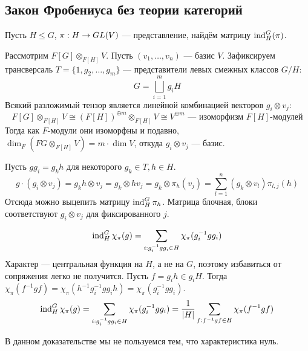 \subsection{Закон Фробениуса без теории категорий}
Пусть $H \le G$, $\pi: H \rightarrow GL(V)$ --- представление, найдём матрицу $\operatorname{ind}^G_H(\pi)$.

Рассмотрим $F[G] \otimes_{F[H]} V$.
Пусть $(v_1, \dots, v_n)$ --- базис $V$.
Зафиксируем трансверсаль $T = \{1, g_2, \dots, g_m\}$ --- представители левых смежных классов $G/H$:
\[G = \bigsqcup\limits_{i = 1}^{m}g_i H\]
Всякий разложимый тензор является линейной комбинацией векторов $g_i \otimes v_j$:
\[F[G] \otimes_{F[H]} V \cong (F[H])^{\oplus m} \otimes_{F[H]} V \cong V^{\oplus m}\text{ --- изоморфизм $F[H]$-модулей}\]
Тогда как $F$-модули они изоморфны и подавно, $\dim_F(FG\otimes_{F[H]}V) = m \cdot \dim V$, откуда $g_i \otimes v_j$ --- базис.

Пусть $gg_i = g_k h$ для некоторого $g_k \in T, h \in H$.
\[g \cdot (g_i \otimes v_j) = g_k h \otimes v_j = g_k \otimes hv_j = g_k \otimes \pi_h(v_j) = \sum\limits_{l = 1}^{n}(g_k \otimes v_l)\pi_{l,j}(h)\]
Отсюда можно выцепить матрицу $\operatorname{ind}^G_H\pi_h$.
Матрица блочная, блоки соответствуют $g_i \otimes v_j$ для фиксированного $j$.

\[\operatorname{ind}^G_H\chi_\pi(g) = \sum\limits_{i: g_i^{-1}g g_i \in H}\chi_\pi(g_i^{-1}g g_{i})\]
Характер --- центральная функция на $H$, а не на $G$, поэтому избавиться от сопряжения легко не получится.
Пусть $f = g_i h \in g_i H$.
Тогда $\chi_\pi(f^{-1}g f) = \chi_\pi(h^{-1}g_i^{-1}g g_{i}h) = \chi_\pi(g_i^{-1}gg_i)$.
\[\operatorname{ind}^G_H\chi_\pi(g) = \sum\limits_{i: g_i^{-1}g g_i \in H}\chi_\pi(g_i^{-1}g g_{i}) = \frac{1}{|H|}\sum\limits_{f: f^{-1}gf \in H}\chi_{\pi}(f^{-1}gf)\]

В данном доказательстве мы не пользуемся тем, что характеристика нуль.

